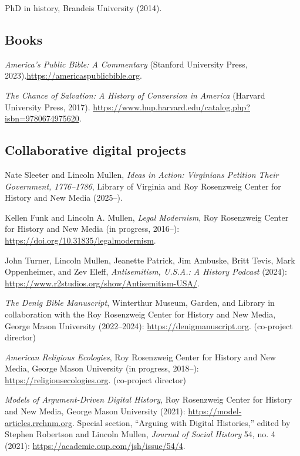 \documentclass[11pt]{article}
\begin{document}
PhD in history, Brandeis University (2014). 



\subsection{Books}\label{Books}

\emph{America's Public Bible: A Commentary} (Stanford University Press, 2023).\newline\url{https://americaspublicbible.org}.

\emph{The Chance of Salvation: A History of Conversion in America} (Harvard University Press, 2017). \url{https://www.hup.harvard.edu/catalog.php?isbn=9780674975620}.

\subsection{Collaborative digital projects}\label{Digital projects}

Nate Sleeter and Lincoln Mullen, \emph{Ideas in Action: Virginians Petition Their Government, 1776–1786}, Library of Virginia and Roy Rosenzweig Center for History and New Media (2025--).

Kellen Funk and Lincoln A. Mullen, \emph{Legal Modernism}, Roy Rosenzweig Center for History and New Media (in progress, 2016--): \url{https://doi.org/10.31835/legalmodernism}.

John Turner, Lincoln Mullen, Jeanette Patrick, Jim Ambuske, Britt Tevis, Mark Oppenheimer, and Zev Eleff, \emph{Antisemitism, U.S.A.: A History Podcast} (2024): \url{https://www.r2studios.org/show/Antisemitism-USA/}.

\emph{The Denig Bible Manuscript}, Winterthur Museum, Garden, and Library in collaboration with the Roy Rosenzweig Center for History and New Media, George Mason University (2022--2024): \url{https://denigmanuscript.org}. (co-project director)

\emph{American Religious Ecologies}, Roy Rosenzweig Center for History and New Media, George Mason University (in progress, 2018--): \url{https://religiousecologies.org}. (co-project director)

\emph{Models of Argument-Driven Digital History}, Roy Rosenzweig Center for History and New Media, George Mason University (2021): \url{https://model-articles.rrchnm.org}. Special section, ``Arguing with Digital Histories,'' edited by Stephen Robertson and Lincoln Mullen, \emph{Journal of Social History} 54, no. 4 (2021): \url{https://academic.oup.com/jsh/issue/54/4}. 
\end{document}
